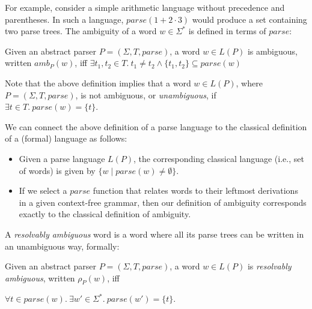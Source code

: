 \documentclass[runningheads]{llncs}
\newcommand{\T}{\Sigma} %
\newcommand{\parse}{\mathit{parse}} %
\newcommand{\amb}{\mathit{amb}}
\begin{document}
\noindent For example, consider a simple arithmetic language without precedence and parentheses. In such a language, $\parse(1 + 2 \cdot 3)$ would produce a set containing two parse trees. %
%
%
The ambiguity of a word $w \in \T^{*}$ is defined in terms of $\parse$:

\begin{definition}
  Given an abstract parser $P = (\T, T, \parse)$, a word $w \in L(P)$
  is ambiguous, written $\amb_P(w)$, iff
%
  $\exists t_1, t_2 \in T.\ t_1 \neq t_2 \land \{t_1, t_2\} \subseteq \parse(w)$
\end{definition}

\noindent
Note that the above definition implies that a word $w \in L(P)$, where
$P = (\T, T, \parse)$, is not ambiguous, or \emph{unambiguous}, if
$\exists t \in T.\ \parse(w) = \{t\}$.

We can connect the above definition of a parse language to the
classical definition of a (formal) language as follows:

\begin{itemize}
\item Given a parse language $L(P)$, the corresponding classical language (i.e., set of words) is given by $\{ w \mid \parse(w) \neq \emptyset \}$.
\item If we select a $\parse$ function that relates words to their leftmost derivations in a given context-free grammar, then our definition of ambiguity corresponds exactly to the classical definition of ambiguity.
\end{itemize}

\noindent A \emph{resolvably ambiguous} word is a word where all its parse trees can be written in an unambiguous way, formally:

\begin{definition}\label{def:resolvable-word}
  Given an abstract parser $P = (\T, T, \parse)$, a word $w \in L(P)$ is \emph{resolvably ambiguous}, written $\rho_P(w)$, iff

  $\forall t \in \parse(w).\ \exists w' \in \T^{*}.\ \parse(w') = \{t\}$.
\end{definition}
\end{document}
